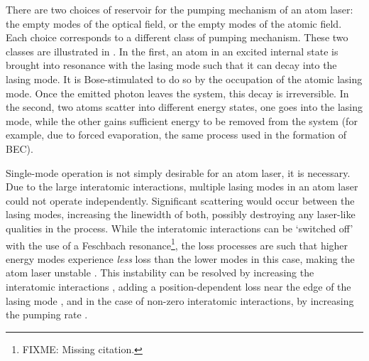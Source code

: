 There are two choices of reservoir for the pumping mechanism of an atom laser: the empty modes of the optical field, or the empty modes of the atomic field.  Each choice corresponds to a different class of pumping mechanism.  These two classes are illustrated in .  In the first, an atom in an excited internal state is brought into resonance with the lasing mode such that it can decay into the lasing mode.  It is Bose-stimulated to do so by the occupation of the atomic lasing mode.  Once the emitted photon leaves the system, this decay is irreversible.  In the second, two atoms scatter into different energy states, one goes into the lasing mode, while the other gains sufficient energy to be removed from the system (for example, due to forced evaporation, the same process used in the formation of BEC).

Single-mode operation is not simply desirable for an atom laser, it is necessary.  Due to the large interatomic interactions, multiple lasing modes in an atom laser could not operate independently.  Significant scattering would occur between the lasing modes, increasing the linewidth of both, possibly destroying any laser-like qualities in the process.  While the interatomic interactions can be `switched off' with the use of a Feschbach resonance\footnote{FIXME: Missing citation.}, the loss processes are such that higher energy modes experience \emph{less} loss than the lower modes in this case, making the atom laser unstable \citep{Haine:2002kp}.  This instability can be resolved by increasing the interatomic interactions \citep{Haine:2002kp}, adding a position-dependent loss near the edge of the lasing mode \citep{Kneer:1998fk}, and in the case of non-zero interatomic interactions, by increasing the pumping rate \citep{Robins:2001pd}.

